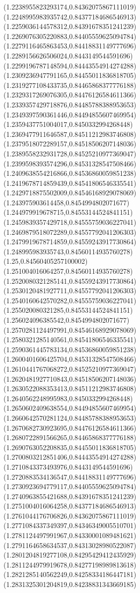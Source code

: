 \documentclass[12pt]{article}
\theoremstyle{plain}
\theoremstyle{definition}
\theoremstyle{remark}
\begin{document}
\begin{figure}
{  (1.2238955823293174,0.84362075867111019)%
  (1.2248995983935742,0.84377184686546913)%
  (1.2259036144578312,0.84391678351241239)%
  (1.2269076305220883,0.84405559625094784)%
  (1.2279116465863453,0.84418831149777696)%
  (1.2289156626506024,0.8443149544591696)%
  (1.2299196787148594,0.84443554914274288)%
  (1.2309236947791165,0.84455011836818705)%
  (1.2319277108433735,0.84465868377776188)%
  (1.2329317269076305,0.84476126584611366)%
  (1.2339357429718876,0.84485788388953653)%
  (1.2349397590361446,0.84494855607469954)%
  (1.2359437751004017,0.8450332994268448)%
  (1.2369477911646587,0.84511212983746808)%
  (1.2379518072289157,0.84518506207148036)%
  (1.2389558232931728,0.84525210977369047)%
  (1.2399598393574296,0.84531328547508466)%
  (1.2409638554216866,0.84536860059851238)%
  (1.2419678714859439,0.84541806546335541)%
  (1.2429718875502009,0.84546168929078069)%
  (1.243975903614458,0.8454994802071677)%
  (1.244979919678715,0.84553144524841151)%
  (1.2459839357429718,0.84555759036227041)%
  (1.2469879518072289,0.84557792041206303)%
  (1.2479919678714859,0.84559243917730864)%
  (1.248995983935743,0.84560114935760278)%
  (1.25,0.84560405257100002)%
  (1.251004016064257,0.84560114935760278)%
  (1.2520080321285141,0.84559243917730864)%
  (1.2530120481927711,0.84557792041206303)%
  (1.2540160642570282,0.84555759036227041)%
  (1.255020080321285,0.84553144524841151)%
  (1.256024096385542,0.8454994802071677)%
  (1.2570281124497991,0.84546168929078069)%
  (1.2580321285140561,0.84541806546335541)%
  (1.2590361445783134,0.84536860059851238)%
  (1.2600401606425704,0.84531328547508466)%
  (1.2610441767068272,0.84525210977369047)%
  (1.2620481927710843,0.84518506207148036)%
  (1.2630522088353413,0.84511212983746808)%
  (1.2640562248995983,0.8450332994268448)%
  (1.2650602409638554,0.84494855607469954)%
  (1.2660642570281124,0.84485788388953653)%
  (1.2670682730923695,0.84476126584611366)%
  (1.2680722891566265,0.84465868377776188)%
  (1.2690763052208835,0.84455011836818705)%
  (1.2700803212851406,0.84443554914274288)%
  (1.2710843373493976,0.8443149544591696)%
  (1.2720883534136547,0.84418831149777696)%
  (1.2730923694779117,0.84405559625094784)%
  (1.2740963855421688,0.84391678351241239)%
  (1.2751004016064258,0.84377184686546913)%
  (1.2761044176706826,0.84362075867111019)%
  (1.2771084337349397,0.84346349005510701)%
  (1.2781124497991967,0.84330001089481621)%
  (1.2791164658634537,0.84313028980522087)%
  (1.2801204819277108,0.84295429412435929)%
  (1.2811244979919678,0.84277198989813618)%
  (1.2821285140562249,0.84258334186447181)%
  (1.2831325301204819,0.84238831343669185)%
}
\end{figure}
\end{document}
